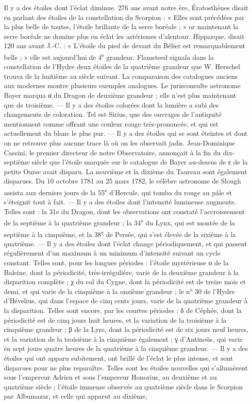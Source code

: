 \documentclass[a4paper, 11pt, oneside]{article}
\begin{document}
Il y a des étoiles dont l'éclat diminue. 276 ans avant notre ère, Ératosthènes disait en parlant des étoiles de la constellation du Scorpion : « Elles sont précédées par la plus belle de toutes, l'étoile brillante de la serre boréale ; » or maintenant la serre boréale ne domine plus en éclat les astérismes d'alentour. Hipparque, disait 120 ans avant J.-C. : « L'étoile du pied de devant du Bélier est remarquablement belle ; » elle est aujourd'hui de 4\textsuperscript{e} grandeur. Flamsteed signala dans la constellation de l'Hydre deux étoiles de la quatrième grandeur que W. Herschel trouva de la huitième au siècle suivant. La comparaison des catalogues anciens aux modernes montre plusieurs exemples analogues. Le jurisconsulte astronome Bayer marqua α du Dragon de deuxième grandeur ; elle n'est plus maintenant que de troisième. --- Il y a des étoiles colorées dont la lumière a subi des changements de coloration. Tel est Sirius, que des ouvrages de l'antiquité mentionnent comme offrant une couleur rouge très-prononcée, et qui est actuellement du blanc le plus pur. --- Il y a des étoiles qui se sont éteintes et dont on ne retrouve plus aucune trace là où on les observait jadis. Jean-Dominique Cassini, le premier directeur de notre Observatoire, annonçait à la fin du dix-septième siècle que l'étoile marquée sur le catalogue de Bayer au-dessus de ε de la petite Ourse avait disparu. La neuvième et la dixième du Taureau sont également disparues. Du 10 octobre 1781 au 25 mars 1782, le célèbre astronome de Slough assista aux derniers jours de la 55\textsuperscript{e} d'Hercule, qui tomba du rouge au pâle et s'éteignit tout à fait. --- Il y a des étoiles dont l'intensité lumineuse augmente. Telles sont : la 31e du Dragon, dont les observations ont constaté l'accroissement de la septième à la quatrième grandeur ; la 34\textsuperscript{e} du Lynx, qui est montée de la septième à la cinquième, et la 38\textsuperscript{e} de Persée, qui s'est élevée de la sixième à la quatrième. --- Il y a des étoiles dont l'éclat change périodiquement, et qui passent régulièrement d'un maximum à un minimum d'intensité suivant un cycle constant. Telles sont, pour les longues périodes : l'étoile mystérieuse ο de la Baleine, dont la périodicité, très-irrégulière, varie de la deuxième grandeur à la disparition complète ; χ du col du Cygne, dont la périodicité est de treize mois et demi, et qui varie de la cinquième à la onzième grandeur ; le n° 30 de l'Hydre d'Hévelius, qui dans l'espace de cinq cents jours, varie de la quatrième grandeur à la disparition. Telles sont encore, par les courtes périodes : δ de Céphée, dont la périodicité est de cinq jours huit heures, et la variation de la troisième à la cinquième grandeur ; β de la Lyre, dont la périodicité est de six jours neuf heures, et la variation de la troisième à la cinquième également ; γ d'Antinoüs, qui varie en sept jours quatre heures de la quatrième à la cinquième grandeur. --- Il y a des étoiles qui ont apparu subitement, ont brillé de l'éclat le plus intense, et sont disparues pour ne plus reparaître. Telles sont les étoiles nouvelles qui s'allumèrent sous l'empereur Adrien et sous l'empereur Honorius, au deuxième et au quatrième siècle ; l'étoile immense observée au quatrième siècle dans le Scorpion par Albumazar, et celle qui apparut au dixième, 
\end{document}
